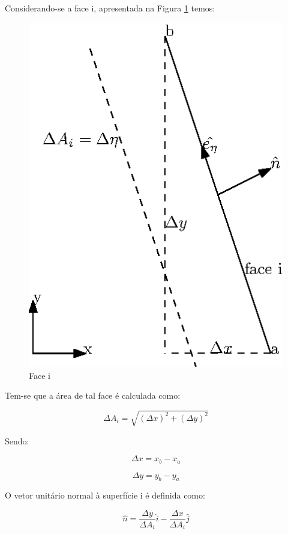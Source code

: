 Considerando-se a face i, apresentada na Figura \ref{face-i} temos:

\begin{figure}[h]
    \centering
    \includegraphics{fig/face-i.eps}
    \caption{Face i}
    \label{face-i}
\end{figure}

Tem-se que a área de tal face é calculada como:

\begin{equation}
    \label{eq:6.11}
    \Delta A_i = \sqrt{(\Delta x)^2 + (\Delta y)^2}
\end{equation}

Sendo:

\begin{equation}
    \label{eq:6.12}
    \Delta x = x_b - x_a
\end{equation}

\begin{equation}
    \label{eq:6.13}
    \Delta y = y_b - y_a
\end{equation}

O vetor unitário normal à superfície i é definida como:

\begin{equation}
    \label{eq:6.14}
    \hat{n} = \frac{\Delta y}{\Delta A_i}\hat{i} - \frac{\Delta x}{\Delta A_i}\hat{j}
\end{equation}

